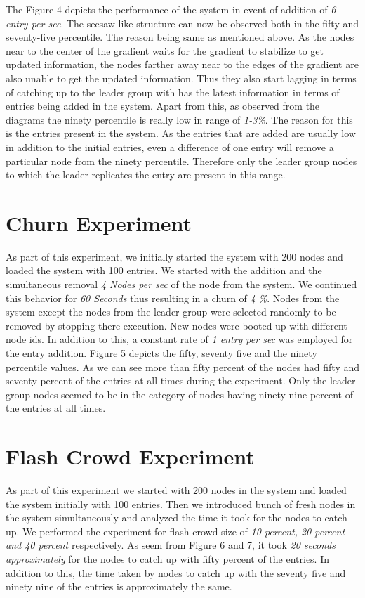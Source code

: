 \documentclass[12pt,a4paper,twoside,openright]{book}
\begin{document}
\par The Figure 4 depicts the performance of the system in event of addition of \textit{6 entry per sec}. The seesaw like structure can now be observed both in the fifty and seventy-five percentile. The reason being same as mentioned above. As the nodes near to the center of the gradient waits for the gradient to stabilize to get updated information, the nodes farther away near to the edges of the gradient are also unable to get the updated information. Thus they also start lagging in terms of catching up to the leader group with has the latest information in terms of entries being added in the system. Apart from this, as observed from the diagrams the ninety percentile is really low in range of \textit{1-3\%}. The reason for this is the entries present in the system. As the entries that are added are usually low in addition to the initial entries, even a difference of one entry will remove a particular node from the ninety percentile. Therefore only the leader group nodes to which the leader replicates the entry are present in this range.



\section{Churn Experiment}

As part of this experiment, we initially started the system with 200 nodes and loaded the system with 100 entries. We started with the addition and the simultaneous removal \textit{4 Nodes per sec} of the node from the system. We continued this behavior for \textit{60 Seconds} thus resulting in a churn of \textit{4 \%}. Nodes from the system except the nodes from the leader group were selected randomly to be removed by stopping there execution. New nodes were booted up with different node ids. In addition to this, a constant rate of \textit{1 entry per sec} was employed for the entry addition. Figure 5 depicts the fifty, seventy five and the ninety percentile values. As we can see more than fifty percent of the nodes had fifty and seventy percent of the entries at all times during the experiment. Only the leader group nodes seemed to be in the category of nodes having ninety nine percent of the entries at all times. 


\section{Flash Crowd Experiment}
As part of this experiment we started with 200 nodes in the system and loaded the system initially with 100 entries. Then we introduced bunch of fresh nodes in the system simultaneously and analyzed the time it took for the nodes to catch up. We performed the experiment for flash crowd size of \textit{10 percent, 20 percent and 40 percent} respectively. As seem from Figure 6 and 7, it took \textit{20 seconds approximately} for the nodes to catch up with fifty percent of the entries. In addition to this, the time taken by nodes to catch up with the seventy five and ninety nine of the entries is approximately the same. 
\end{document}
